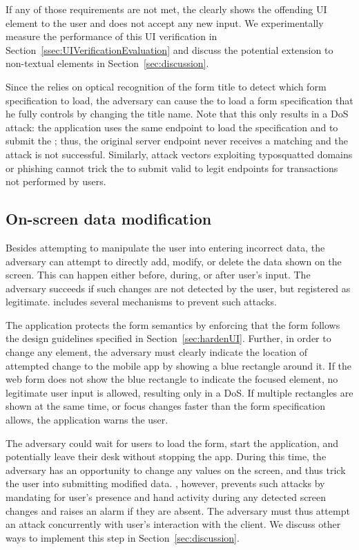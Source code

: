 If any of those requirements are not met, the \app clearly shows the offending UI element to the user and does not accept any new input.
We experimentally measure the performance of this UI verification in Section~\ref{ssec:UIVerificationEvaluation} and discuss the potential extension to non-textual elements in Section~\ref{sec:discussion}.


Since the \app relies on optical recognition of the form title to detect which form specification to load, the adversary can cause the \app to load a form specification that he fully controls by changing the title name.
Note that this only results in a DoS attack: the application uses the same endpoint to load the specification and to submit the \POI; thus, the original server endpoint never receives a matching \POI and the attack is not successful.
Similarly, attack vectors exploiting typosquatted domains or phishing cannot trick the \app to submit valid \PsOI to legit endpoints for transactions not performed by users.


\subsection{On-screen data modification}
Besides attempting to manipulate the user into entering incorrect data, the adversary can attempt to directly add, modify, or delete the data shown on the screen. This can happen either before, during, or after user's input. 
The adversary succeeds if such changes are not detected by the user, but registered as legitimate.
\sysname includes several mechanisms to prevent such attacks.


The application protects the form semantics by enforcing that the form follows the design guidelines specified in Section~\ref{sec:hardenUI}.
Further, in order to change any element, the adversary must clearly indicate the location of attempted change to the mobile app by showing a blue rectangle around it.
If the web form does not show the blue rectangle to indicate the focused element, no legitimate user input is allowed, resulting only in a DoS.
If multiple rectangles are shown at the same time, or focus changes faster than the form specification allows, the application warns the user.

The adversary could wait for users to load the form, start the application, and potentially leave their desk without stopping the app.
During this time, the adversary has an opportunity to change any values on the screen, and thus trick the user into submitting modified data.
\sysname, however, prevents such attacks by mandating for user's presence and hand activity during any detected screen changes and raises an alarm if they are absent.
The adversary must thus attempt an attack concurrently with user's interaction with the client.
We discuss other ways to implement this step in Section~\ref{sec:discussion}.

